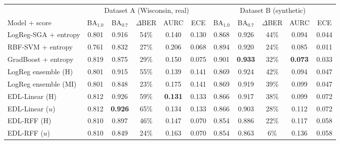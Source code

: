 \begin{tabular}{lccccc|ccccc}\toprule
 & \multicolumn{5}{c}{Dataset A (Wisconsin, real)} & \multicolumn{5}{c}{Dataset B (synthetic)}\\
Model + score & BA$_{1.0}$ & BA$_{0.7}$ & $\Delta$BER & AURC & ECE & BA$_{1.0}$ & BA$_{0.7}$ & $\Delta$BER & AURC & ECE\\\midrule
LogReg-SGA + entropy & 0.801 & 0.916 & 54\% & 0.140 & 0.130 & 0.868 & 0.926 & 44\% & 0.094 & 0.044\\
RBF-SVM + entropy & 0.761 & 0.832 & 27\% & 0.206 & 0.068 & 0.894 & 0.920 & 24\% & 0.085 & 0.011\\
GradBoost + entropy & 0.819 & 0.875 & 29\% & 0.150 & 0.075 & 0.901 & \textbf{0.933} & 32\% & \textbf{0.073} & 0.033\\
LogReg ensemble (H) & 0.801 & 0.915 & 55\% & 0.139 & 0.141 & 0.869 & 0.924 & 42\% & 0.094 & 0.047\\
LogReg ensemble (MI) & 0.801 & 0.848 & 23\% & 0.175 & 0.141 & 0.869 & 0.919 & 39\% & 0.099 & 0.047\\
EDL-Linear (H) & 0.812 & 0.926 & 59\% & \textbf{0.131} & 0.133 & 0.866 & 0.917 & 38\% & 0.099 & 0.072\\
EDL-Linear ($u$) & 0.812 & \textbf{0.926} & 65\% & 0.134 & 0.133 & 0.866 & 0.903 & 28\% & 0.112 & 0.072\\
EDL-RFF (H) & 0.810 & 0.897 & 46\% & 0.147 & 0.070 & 0.854 & 0.886 & 22\% & 0.117 & 0.058\\
EDL-RFF ($u$) & 0.810 & 0.849 & 24\% & 0.163 & 0.070 & 0.854 & 0.863 & 6\% & 0.136 & 0.058\\
\bottomrule\end{tabular}